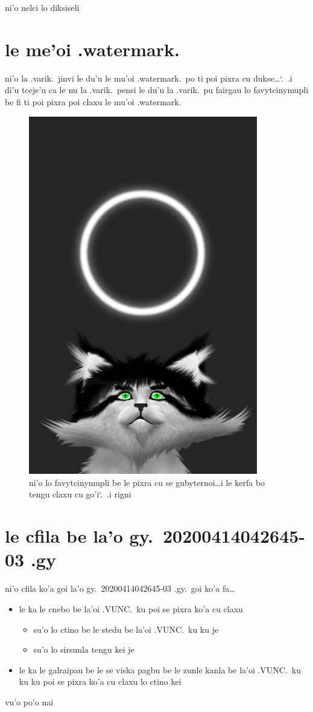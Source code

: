 \documentclass{report}
\newcommand\sds{\spacefactor\sfcode`.\ \space}
\begin{document}
ni'o nelci lo diksiseli

\section{le me'oi .watermark.}
ni'o la .varik.\ jinvi le du'u le mu'oi .watermark.\ po ti poi pixra cu dukse\ldots\sds .i di'u tceje'u ca le nu la .varik.\ pensi le du'u la .varik.\ pu fairgau lo favytcinymupli be fi ti poi pixra poi claxu le mu'oi .watermark.

\begin{figure}[ht]
	\centering
	\includegraphics[width=10cm]{20200414042645-03/20200414042645-03-uw.png}
	\caption[center]{ni'o lo favytcinymupli be le pixra cu se gubyternoi\ldots i le kerfa bo tengu claxu cu go'i\sds  .i rigni}
\end{figure}

\section{le cfila be la'o gy.\ 20200414042645-03 .gy}
ni'o cfila ko'a goi la'o gy.\ 20200414042645-03 .gy.\ goi ko'a fa\ldots
\begin{itemize}
	\item le ka le cnebo be la'oi .VUNC.\ ku poi se pixra ko'a cu claxu
	\begin{itemize}
		\item su'o lo ctino be le stedu be la'oi .VUNC.\ ku ku je
		\item su'o lo sirsunla tengu kei je
	\end{itemize}
	\item le ka le galraipau be le se viska pagbu be le zunle kanla be la'oi .VUNC.\ ku ku ku poi se pixra ko'a cu claxu lo ctino kei
\end{itemize}
vu'o po'o nai
\end{document}
